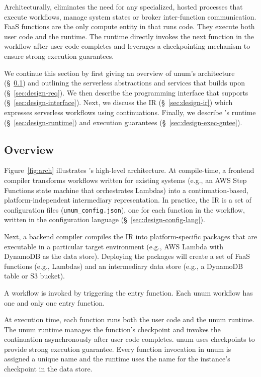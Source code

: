 Architecturally, \name{} eliminates the need for any specialized, hosted
processes that execute workflows, manage system states or broker
inter-function communication. FaaS functions are the only compute entity in
\name{} that runs code. They execute both user code and the \name{} runtime. The
\name{} runtime directly invokes the next function in the workflow after user
code completes and leverages a checkpointing mechanism to ensure strong
execution guarantees.

We continue this section by first giving an overview of unum's architecture
(\S~\ref{sec:design-overview}) and outlining the serverless abstractions and
services that \name{} builds upon (\S~\ref{sec:design-req}). We then
describe the programming interface that \name{} supports
(\S~\ref{sec:design-interface}). Next, we discuss the \name{} IR
(\S~\ref{sec:design-ir}) which expresses serverless workflows using
continuations. Finally, we describe \name{}'s runtime
(\S~\ref{sec:design-runtime}) and execution guarantees
(\S~\ref{sec:design-exec-gntee}).

\subsection{Overview}\label{sec:design-overview}

Figure~\ref{fig:arch} illustrates \name{}'s high-level architecture. At
compile-time, a frontend compiler transforms workflows written for existing
systems (e.g., an AWS Step Functions state machine that orchestrates Lambdas)
into a continuation-based, platform-independent intermediary representation.
In practice, the IR is a set of configuration files
(\texttt{unum\_config.json}), one for each function in the workflow, written
in the \name{} configuration language (\S~\ref{sec:design-config-lang}).

Next, a backend compiler compiles the IR into platform-specific packages that
are executable in a particular target environment (e.g., AWS Lambda with
DynamoDB as the data store). Deploying the packages will create a set of FaaS
functions (e.g., Lambdas) and an intermediary data store (e.g., a DynamoDB
table or S3 bucket).

A workflow is invoked by triggering the entry function. Each unum workflow has
one and only one entry function. 

At execution time, each function runs both the user code and the unum runtime.
The unum runtime manages the function's checkpoint and invokes the
continuation asynchronously after user code completes. unum uses checkpoints
to provide strong execution guarantee. Every function invocation in unum is
assigned a unique name and the runtime uses the name for the instance's
checkpoint in the data store.


